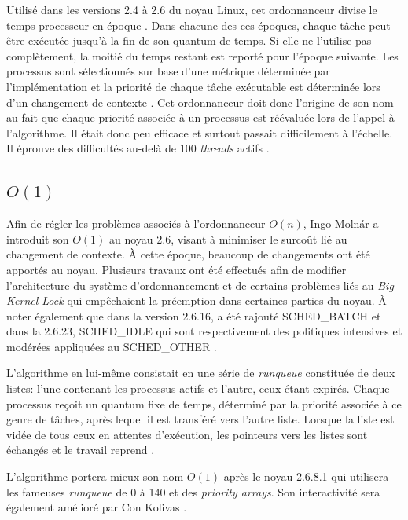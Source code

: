 \documentclass[letterpaper]{article}
\begin{document}
Utilisé dans les versions 2.4 à 2.6 du noyau Linux, cet ordonnanceur divise le temps processeur en \og époque \fg. Dans chacune des ces époques, chaque tâche peut être exécutée jusqu'à la fin de son quantum de temps. Si elle ne l'utilise pas complètement, la moitié du temps restant est reporté pour l'époque suivante. Les processus sont sélectionnés sur base d'une métrique déterminée par l'implémentation et la priorité de chaque tâche exécutable est déterminée lors d'un changement de contexte \citep{Bovet:2005:ULK:1077084}.
Cet ordonnanceur doit donc l'origine de son nom au fait que chaque priorité associée à un processus est réévaluée lors de l'appel à l'algorithme. Il était donc peu efficace et surtout passait difficilement à l'échelle. Il éprouve des difficultés au-delà de 100 \textit{threads} actifs \citep{Nieh:2001:VRO:647055.715911}.

\subsection{$O(1)$}

Afin de régler les problèmes associés à l'ordonnanceur $O(n)$, Ingo Molnár a introduit son $O(1)$ au noyau 2.6, visant à minimiser le surcoût lié au changement de contexte. À cette époque, beaucoup de changements ont été apportés au noyau. Plusieurs travaux ont été effectués afin de modifier l'architecture du système d'ordonnancement et de certains problèmes liés au \textit{Big Kernel Lock} \citep{bryant2003linux} qui empêchaient la préemption dans certaines parties du noyau. À noter également que dans la version 2.6.16, a été rajouté SCHED\_BATCH et dans la 2.6.23, SCHED\_IDLE qui sont respectivement des politiques intensives et modérées appliquées au SCHED\_OTHER \citep{Pabla:2009:CFS:1594371.1594375}. 

L'algorithme en lui-même consistait en une série de \textit{runqueue} constituée de deux listes: l'une contenant les processus actifs et l'autre, ceux étant expirés. Chaque processus reçoit un quantum fixe de temps, déterminé par la priorité associée à ce genre de tâches, après lequel il est transféré vers l'autre liste. Lorsque la liste est vidée de tous ceux en attentes d'exécution, les pointeurs vers les listes sont échangés et le travail reprend \citep{Love:2010:LKD:1855096}.

L'algorithme portera mieux son nom $O(1)$ après le noyau 2.6.8.1 qui utilisera les fameuses \textit{runqueue} de 0 à 140 et des \textit{priority arrays}. Son interactivité sera également amélioré par Con Kolivas \citep{Aas05understandingthe}.
\end{document}
